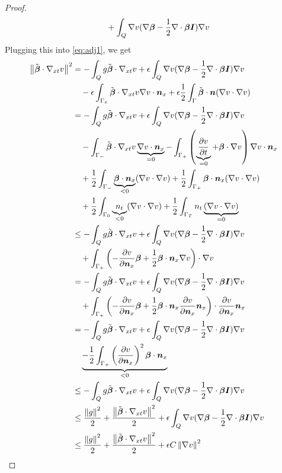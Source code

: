 \documentclass{article}
\begin{document}
\begin{proof}
\begin{align*}
&\quad+\int_Q\nabla v(\nabla\boldsymbol\beta-\frac{1}{2}\nabla\cdot\boldsymbol\beta\boldsymbol I)\nabla v\\
\end{align*}
Plugging this into \eqref{eq:adj1}, we get
\begin{align*}
\norm{\tilde\bfbeta\cdot\Gradxt v}^2
&=-\int_Q g\tilde\bfbeta\cdot\Gradxt v
+\epsilon\int_Q\Grad v(\Grad\bfbeta-\frac{1}{2}\Div\bfbeta\bfI)\Grad v\\
&\quad-\epsilon\int_{\Gamma_x}\tilde\bfbeta\cdot\Gradxt v\Grad v\cdot\bfn_x
+\epsilon\frac{1}{2}\int_\Gamma\tilde\bfbeta\cdot\bfn(\Grad v\cdot\Grad v)\\
%
&=-\int_Q g\tilde\bfbeta\cdot\Gradxt v
+\epsilon\int_Q\Grad v(\Grad\bfbeta-\frac{1}{2}\Div\bfbeta\bfI)\Grad v\\
&\quad
-\int_{\Gamma_-}\tilde\bfbeta\cdot\Gradxt v\underbrace{\Grad v\cdot\bfn_x}_{=0}
-\int_{\Gamma_+}\LRp{\underbrace{\pd{v}{t}}_{=0}+\bfbeta\cdot\Grad v}\Grad v\cdot\bfn_x\\
&\quad
+\frac{1}{2}\int_{\Gamma_-}\underbrace{\bfbeta\cdot\bfn_x}_{<0}(\Grad v\cdot\Grad v)
+\frac{1}{2}\int_{\Gamma_+}\bfbeta\cdot\bfn_x(\Grad v\cdot\Grad v)\\
&\quad
+\frac{1}{2}\int_{\Gamma_0}\underbrace{n_t}_{<0}(\Grad v\cdot\Grad v)
+\frac{1}{2}\int_{\Gamma_T}n_t\underbrace{(\Grad v\cdot\Grad v)}_{=0}\\
%
&\leq-\int_Q g\tilde\bfbeta\cdot\Gradxt v
+\epsilon\int_Q\Grad v(\Grad\bfbeta-\frac{1}{2}\Div\bfbeta\bfI)\Grad v\\
&\quad
+\int_{\Gamma_+}\LRp{-\pd{v}{\bfn_x}\bfbeta
+\frac{1}{2}\bfbeta\cdot\bfn_x\Grad v}\cdot\Grad v\\
%
&=-\int_Q g\tilde\bfbeta\cdot\Gradxt v
+\epsilon\int_Q\Grad v(\Grad\bfbeta-\frac{1}{2}\Div\bfbeta\bfI)\Grad v\\
&\quad
+\int_{\Gamma_+}\LRp{-\pd{v}{\bfn_x}\bfbeta
+\frac{1}{2}\bfbeta\cdot\bfn_x\pd{v}{\bfn_x}\bfn_x}\cdot\pd{v}{\bfn_x}\bfn_x\\
%
&=-\int_Q g\tilde\bfbeta\cdot\Gradxt v
+\epsilon\int_Q\Grad v(\Grad\bfbeta-\frac{1}{2}\Div\bfbeta\bfI)\Grad v\\
&\quad
\underbrace{-\frac{1}{2}\int_{\Gamma_+}\LRp{\pd{v}{\bfn_x}}^2\bfbeta\cdot\bfn_x}_{<0}\\
%
&\leq-\int_Q g\tilde\bfbeta\cdot\Gradxt v
+\epsilon\int_Q\Grad v(\Grad\bfbeta-\frac{1}{2}\Div\bfbeta\bfI)\Grad v\\
%
&\leq\frac{\norm{g}^2}{2}+\frac{\norm{\tilde\bfbeta\cdot\Gradxt v}^2}{2}
+\epsilon\int_Q\Grad v(\Grad\bfbeta-\frac{1}{2}\Div\bfbeta\bfI)\Grad v\\
%
&\leq\frac{\norm{g}^2}{2}+\frac{\norm{\tilde\bfbeta\cdot\Gradxt v}^2}{2}
+\epsilon C\norm{\Grad v}^2
\end{align*}
\end{proof}
\end{document}
